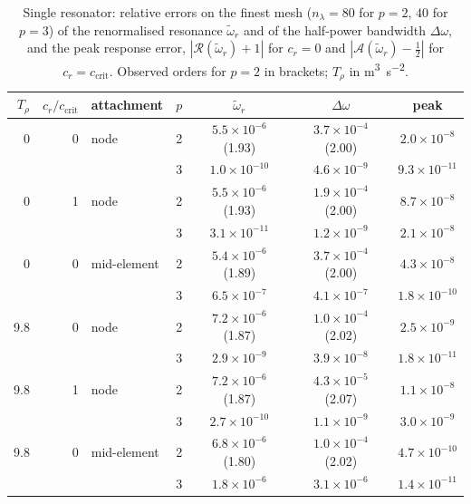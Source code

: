 {\begin{table}[t]
    \centering
    \caption{Single resonator: relative errors on the finest mesh ($n_\lambda=80$ for $p=2$, $40$ for $p=3$) of the renormalised resonance $\widetilde{\omega}_r$ and of the half-power bandwidth $\Delta\omega$, and the peak response error, $|\mathcal{R}(\widetilde{\omega}_r)+1|$ for $c_r=0$ and $|\mathcal{A}(\widetilde{\omega}_r)-\tfrac12|$ for $c_r=c_\mathrm{crit}$. Observed orders for $p=2$ in brackets; $T_\rho$ in \si{\meter\cubed\per\second\squared}.}
    \label{tab:num_L1_3}
    \footnotesize
    \begin{tabular}{rrlrccc}
        \hline
        $T_\rho$ & $c_r/c_\mathrm{crit}$ & attachment & $p$ & $\widetilde{\omega}_r$ & $\Delta\omega$ & peak \\
        \hline
        0   & 0 & node        & 2 & $5.5\times10^{-6}$ (1.93) & $3.7\times10^{-4}$ (2.00) & $2.0\times10^{-8}$ \\
            &   &             & 3 & $1.0\times10^{-10}$ & $4.6\times10^{-9}$ & $9.3\times10^{-11}$ \\
        0   & 1 & node        & 2 & $5.5\times10^{-6}$ (1.93) & $1.9\times10^{-4}$ (2.00) & $8.7\times10^{-8}$ \\
            &   &             & 3 & $3.1\times10^{-11}$ & $1.2\times10^{-9}$ & $2.1\times10^{-8}$ \\
        0   & 0 & mid-element & 2 & $5.4\times10^{-6}$ (1.89) & $3.7\times10^{-4}$ (2.00) & $4.3\times10^{-8}$ \\
            &   &             & 3 & $6.5\times10^{-7}$ & $4.1\times10^{-7}$ & $1.8\times10^{-10}$ \\
        9.8 & 0 & node        & 2 & $7.2\times10^{-6}$ (1.87) & $1.0\times10^{-4}$ (2.02) & $2.5\times10^{-9}$ \\
            &   &             & 3 & $2.9\times10^{-9}$ & $3.9\times10^{-8}$ & $1.8\times10^{-11}$ \\
        9.8 & 1 & node        & 2 & $7.2\times10^{-6}$ (1.87) & $4.3\times10^{-5}$ (2.07) & $1.1\times10^{-8}$ \\
            &   &             & 3 & $2.7\times10^{-10}$ & $1.1\times10^{-9}$ & $3.0\times10^{-9}$ \\
        9.8 & 0 & mid-element & 2 & $6.8\times10^{-6}$ (1.80) & $1.0\times10^{-4}$ (2.02) & $4.7\times10^{-10}$ \\
            &   &             & 3 & $1.8\times10^{-6}$ & $3.1\times10^{-6}$ & $1.4\times10^{-11}$ \\
        \hline
    \end{tabular}
\end{table}

}
